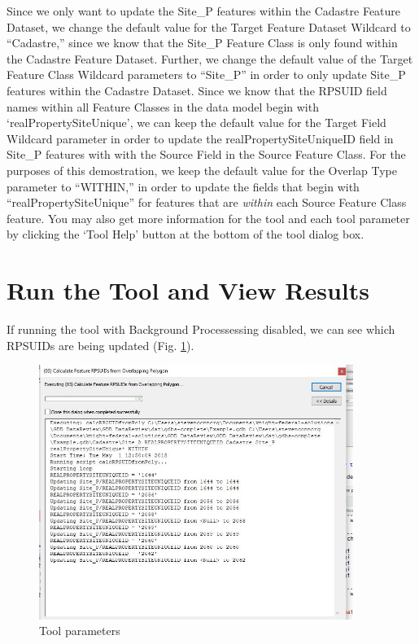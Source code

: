 \documentclass[openany]{book}
\theoremstyle{definition}
\theoremstyle{definition}
\theoremstyle{definition}
\theoremstyle{remark}
\begin{document}
Since we only want to update the Site\_P features within the Cadastre
Feature Dataset, we change the default value for the Target Feature
Dataset Wildcard to ``Cadastre,'' since we know that the Site\_P Feature
Class is only found within the Cadastre Feature Dataset. Further, we
change the default value of the Target Feature Class Wildcard parameters
to ``Site\_P'' in order to only update Site\_P features within the
Cadastre Dataset. Since we know that the RPSUID field names within all
Feature Classes in the data model begin with `realPropertySiteUnique',
we can keep the default value for the Target Field Wildcard parameter in
order to update the realPropertySiteUniqueID field in Site\_P features
with with the Source Field in the Source Feature Class. For the purposes
of this demostration, we keep the default value for the Overlap Type
parameter to ``WITHIN,'' in order to update the fields that begin with
``realPropertySiteUnique'' for features that are \emph{within} each
Source Feature Class feature. You may also get more information for the
tool and each tool parameter by clicking the `Tool Help' button at the
bottom of the tool dialog box.

\section{Run the Tool and View
Results}\label{run-the-tool-and-view-results-3}

If running the tool with Background Processessing disabled, we can see
which RPSUIDs are being updated (Fig. \ref{fig:sjcmessages}).

\begin{figure}[H]

{\centering \includegraphics[width=4.02in,]{figures/spatjoinCalc-toolmessages} 

}

\caption{Tool parameters}\label{fig:sjcmessages}
\end{figure}
\end{document}
